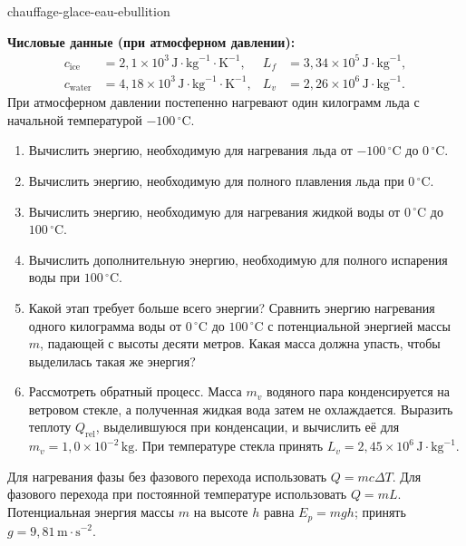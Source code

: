
\begin{exo}{chauffage-glace-eau-ebullition}

\textbf{Числовые данные (при атмосферном давлении):}
\[
\begin{aligned}
c_{\text{ice}} &= 2{,}1\times10^3\,\text{J}\!\cdot\!\text{kg}^{-1}\!\cdot\!\text{K}^{-1},
& L_f &= 3{,}34\times10^5\,\text{J}\!\cdot\!\text{kg}^{-1},\\
c_{\text{water}} &= 4{,}18\times10^3\,\text{J}\!\cdot\!\text{kg}^{-1}\!\cdot\!\text{K}^{-1},
& L_v &= 2{,}26\times10^6\,\text{J}\!\cdot\!\text{kg}^{-1}.
\end{aligned}
\]
При атмосферном давлении постепенно нагревают один килограмм льда с начальной температурой $-100\,{}^\circ\text{C}$.

\begin{enumerate}
  \item Вычислить энергию, необходимую для нагревания льда от $-100\,{}^\circ\text{C}$ до $0\,{}^\circ\text{C}$.
  \item Вычислить энергию, необходимую для полного плавления льда при $0\,{}^\circ\text{C}$.
  \item Вычислить энергию, необходимую для нагревания жидкой воды от $0\,{}^\circ\text{C}$ до $100\,{}^\circ\text{C}$.
  \item Вычислить дополнительную энергию, необходимую для полного испарения воды при $100\,{}^\circ\text{C}$.
  \item Какой этап требует больше всего энергии? Сравнить энергию нагревания одного килограмма воды от $0\,{}^\circ\text{C}$ до $100\,{}^\circ\text{C}$ с потенциальной энергией массы $m$, падающей с высоты десяти метров. Какая масса должна упасть, чтобы выделилась такая же энергия?
  \item Рассмотреть обратный процесс. Масса $m_v$ водяного пара конденсируется на ветровом стекле, а полученная жидкая вода затем не охлаждается. Выразить теплоту $Q_{\text{rel}}$, выделившуюся при конденсации, и вычислить её для $m_v=1{,}0\times10^{-2}\,\text{kg}$. При температуре стекла принять $L_v=2{,}45\times10^6\,\text{J}\!\cdot\!\text{kg}^{-1}$.
\end{enumerate}

\begin{indication}
Для нагревания фазы без фазового перехода использовать $Q=mc\Delta T$. Для фазового перехода при постоянной температуре использовать $Q=mL$. Потенциальная энергия массы $m$ на высоте $h$ равна $E_p=mgh$; принять $g=9{,}81\,\text{m}\!\cdot\!\text{s}^{-2}$.
\end{indication}


\end{exo}

